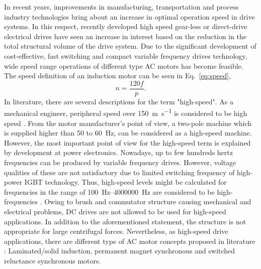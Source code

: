In recent years, improvements in manufacturing, transportation and process industry
technologies bring about an increase in optimal operation speed in drive systems. In this
respect, recently developed high speed gear-less or direct-drive electrical drives have seen an
increase in interest based on the reduction in the total structural volume of the drive
system. Due to the significant development of cost-effective, fast switching and compact
variable frequency drives technology, wide speed range operations of different type AC motors
has become feasible. The speed definition of an induction motor can be seen in
Eq.~\ref{eq:speed},
%
\begin{equation}  \label{eq:speed}
  n = \frac{120 f}{p}.
\end{equation}
%
In literature, there are several descriptions for the term "high-speed".  As a mechanical
engineer, peripheral speed over \SI{150}{\meter\per\second} is considered to be high speed
\cite{gieras2011performance}. From the motor manufacturer's point of view, a two-pole machine
which is supplied higher than 50 to \SI{60}{\hertz}, can be considered as a high-speed machine.
However, the most important point of view for the high-speed term is explained by development
at power electronics. Nowadays, up to few hundreds hertz frequencies can be produced by
variable frequency drives. However, voltage qualities of these are not satisfactory due to
limited switching frequency of high-power IGBT technology. Thus, high-speed levels might be
calculated for frequencies in the range of \qtyrange{100}{4000000}{\hertz} are considered to be
high-frequencies \cite{pyrhonen1991high}.  Owing to brush and commutator structure causing mechanical and
electrical problems, DC drives are not allowed to be used for high-speed applications. In
addition to the aforementioned statement, the structure is not appropriate for large
centrifugal forces.  Nevertheless, as high-speed drive applications, there are different type
of AC motor concepts proposed in literature
\cite{gieras2011performance, pyrhonen1991high, lahteenmaki2002design, saari1998thermal}:
Laminated/solid induction, permanent
magnet synchronous and switched reluctance synchronous motors.

